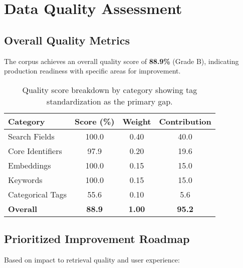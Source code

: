 \section{Data Quality Assessment}

\subsection{Overall Quality Metrics}

The corpus achieves an overall quality score of \textbf{88.9\%} (Grade B), indicating production readiness with specific areas for improvement.

\begin{table}[ht]
\centering
\begin{tabular}{lccc}
\toprule
\textbf{Category} & \textbf{Score (\%)} & \textbf{Weight} & \textbf{Contribution} \\
\midrule
Search Fields & 100.0 & 0.40 & 40.0 \\
Core Identifiers & 97.9 & 0.20 & 19.6 \\
Embeddings & 100.0 & 0.15 & 15.0 \\
Keywords & 100.0 & 0.15 & 15.0 \\
Categorical Tags & 55.6 & 0.10 & 5.6 \\
\midrule
\textbf{Overall} & \textbf{88.9} & \textbf{1.00} & \textbf{95.2} \\
\bottomrule
\end{tabular}
\caption{Quality score breakdown by category showing tag standardization as the primary gap.}
\label{tab:quality-breakdown}
\end{table}

\subsection{Prioritized Improvement Roadmap}

Based on impact to retrieval quality and user experience:

